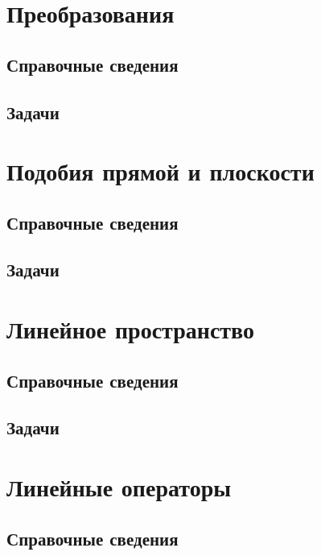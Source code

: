 \section{Преобразования}

\subsection*{Справочные сведения}

\subsection*{Задачи}




\section{Подобия прямой и плоскости}


\subsection*{Справочные сведения}

\subsection*{Задачи}



\section{Линейное пространство}

\subsection*{Справочные сведения}

\subsection*{Задачи}



\section{Линейные операторы}

\subsection*{Справочные сведения}

